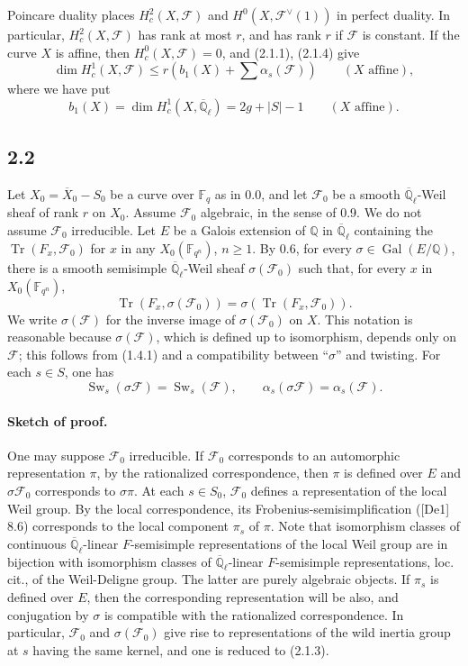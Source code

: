 \documentclass[10pt]{article}
\newcommand{\F}{\mathbb{F}}
\newcommand{\Q}{\mathbb{Q}}
\newcommand{\Ql}{\overline{\mathbb Q}_{\ell}}
\newcommand{\Tr}{\operatorname{Tr}}
\newcommand{\Gal}{\operatorname{Gal}}
\newcommand{\Sw}{\operatorname{Sw}}
\begin{document}
Poincare duality places $H^2_c(X,\mathcal F)$ and $H^0(X,\mathcal F^\vee(1))$ in perfect duality.
In particular, $H^2_c(X,\mathcal F)$ has rank at most $r$, and has rank $r$ if $\mathcal F$ is constant.
If the curve $X$ is affine, then $H^0_c(X,\mathcal F)=0$, and (2.1.1), (2.1.4) give
\begin{equation}
 \dim H^1_c(X,\mathcal F)\le r\left(b_1(X)+\sum \alpha_s(\mathcal F)\right)\qquad (X\text{ affine}),
\tag{2.1.6}
\end{equation}
where we have put
\begin{equation}
 b_1(X)=\dim H^1_c(X,\Ql)=2g+|S|-1\qquad (X\text{ affine}).
\tag{2.1.7}
\end{equation}

\subsection*{2.2}
Let $X_0=\overline X_0-S_0$ be a curve over $\F_q$ as in 0.0, and let $\mathcal F_0$ be a smooth $\Ql$-Weil sheaf of rank $r$ on $X_0$.
Assume $\mathcal F_0$ algebraic, in the sense of 0.9.
We do not assume $\mathcal F_0$ irreducible.
Let $E$ be a Galois extension of $\Q$ in $\Ql$ containing the $\Tr(F_x,\mathcal F_0)$ for $x$ in any $X_0(\F_{q^n})$, $n\ge1$.
By 0.6, for every $\sigma\in\Gal(E/\Q)$, there is a smooth semisimple $\Ql$-Weil sheaf $\sigma(\mathcal F_0)$ such that, for every $x$ in $X_0(\F_{q^n})$,
\[
 \Tr(F_x,\sigma(\mathcal F_0))=\sigma(\Tr(F_x,\mathcal F_0)).
\]
We write $\sigma(\mathcal F)$ for the inverse image of $\sigma(\mathcal F_0)$ on $X$.
This notation is reasonable because $\sigma(\mathcal F)$, which is defined up to isomorphism, depends only on $\mathcal F$; this follows from (1.4.1) and a compatibility between ``$\sigma$'' and twisting.
For each $s\in S$, one has
\begin{equation}
 \Sw_s(\sigma\mathcal F)=\Sw_s(\mathcal F),\qquad
 \alpha_s(\sigma\mathcal F)=\alpha_s(\mathcal F).
\tag{2.2.1}
\end{equation}

\paragraph{Sketch of proof.}
One may suppose $\mathcal F_0$ irreducible.
If $\mathcal F_0$ corresponds to an automorphic representation $\pi$, by the rationalized correspondence, then $\pi$ is defined over $E$ and $\sigma\mathcal F_0$ corresponds to $\sigma\pi$.
At each $s\in S_0$, $\mathcal F_0$ defines a representation of the local Weil group.
By the local correspondence, its Frobenius-semisimplification ([De1] 8.6) corresponds to the local component $\pi_s$ of $\pi$.
Note that isomorphism classes of continuous $\Ql$-linear $F$-semisimple representations of the local Weil group are in bijection with isomorphism classes of $\Ql$-linear $F$-semisimple representations, loc. cit., of the Weil-Deligne group.
The latter are purely algebraic objects.
If $\pi_s$ is defined over $E$, then the corresponding representation will be also, and conjugation by $\sigma$ is compatible with the rationalized correspondence.
In particular, $\mathcal F_0$ and $\sigma(\mathcal F_0)$ give rise to representations of the wild inertia group at $s$ having the same kernel, and one is reduced to (2.1.3).
\end{document}
